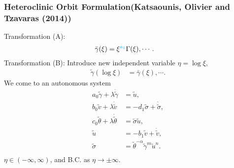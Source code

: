 \documentclass{beamer}
\def\bg{{\bar{\gamma}}}
\def\bv{{\bar{v}}}
\def\bth{{\bar{\theta}}}
\def\bs{{\bar{\sigma}}}
\def\bu{{\bar{u}}}
\def\tg{{\tilde{\gamma}}}
\def\tv{{\tilde{v}}}
\def\tth{{\tilde{\theta}}}
\def\ts{{\tilde{\sigma}}}
\def\tu{{\tilde{u}}}
\def\dtg{{\dot{\tilde{\gamma}}}}
\def\dtv{{\dot{\tilde{v}}}}
\def\dtth{{\dot{\tilde{\theta}}}}
\def\dts{{\dot{\tilde{\sigma}}}}
\begin{document}
\begin{frame}
 \frametitle{Heteroclinic Orbit Formulation({\footnotesize Katsaounis, Olivier and Tzavaras (2014)})}
 Transformation (A):\begin{equation} \label{eq:CAPtoBAR}
\begin{aligned}
 \bg(\xi)&=\xi^{ \color{cyan} a_1}\Gamma(\xi), \cdots.
\end{aligned}
\end{equation} 
 Transformation (B): Introduce new independent variable {\color{cyan} $\eta=\log\xi$},
\begin{equation} \label{eq:BARtoTIL}
\begin{aligned}
 \tg(\log\xi)&=\bg(\xi), \cdots.
\end{aligned}
\end{equation}
We come to an autonomous system
{\scriptsize
\begin{equation} \label{eq:tildesys}
 \begin{aligned}
  a_0\tg + \lambda\dtg &=\tu,\\
  b_0\tv + \lambda\dtv &=-d_1 \ts + \dts,\\
  c_0\tth+ \lambda\dtth&=\ts\tu,\\
  \tu&=-b_1\tv+\dtv,\\
    \ts &=\tth^{-\alpha}\tg^m\tu^n.\\
 \end{aligned}
\end{equation}
}
$\eta\in (-\infty,\infty)$, and B.C. as $\eta \rightarrow \pm \infty$.
\end{frame}
% 
\end{document}
